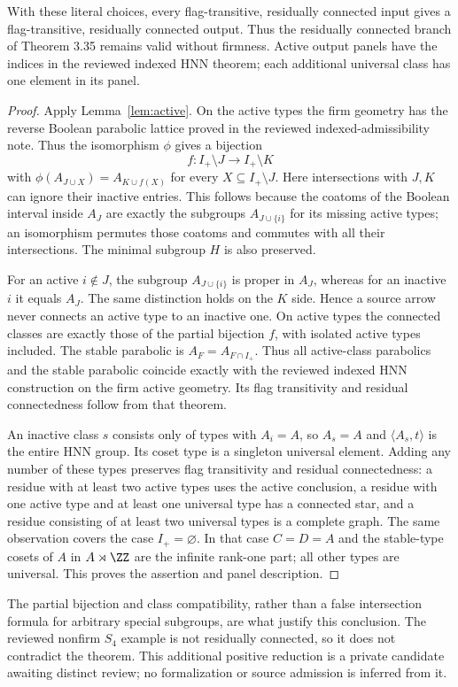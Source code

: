 \begin{theorem}\label{thm:rc}
With these literal choices, every flag-transitive, residually connected
input gives a flag-transitive, residually connected output. Thus the
residually connected branch of Theorem 3.35 remains valid without
firmness. Active output panels have the indices in the reviewed
indexed HNN theorem; each additional universal class has one element
in its panel.
\end{theorem}
\begin{proof}
Apply Lemma~\ref{lem:active}. On the active types the firm geometry
has the reverse Boolean parabolic lattice proved in the reviewed
indexed-admissibility note. Thus the isomorphism $\phi$ gives a
bijection
\[
 f:I_+\setminus J\longrightarrow I_+\setminus K
\]
with
$\phi(A_{J\cup X})=A_{K\cup f(X)}$ for every
$X\subseteq I_+\setminus J$. Here intersections with $J,K$
can ignore their inactive entries. This follows because the coatoms
of the Boolean interval inside $A_J$ are exactly the subgroups
$A_{J\cup\{i\}}$ for its missing active types; an isomorphism
permutes those coatoms and commutes with all their intersections.
The minimal subgroup $H$ is also preserved.

For an active $i\notin J$, the subgroup $A_{J\cup\{i\}}$ is
proper in $A_J$, whereas for an inactive $i$ it equals $A_J$.
The same distinction holds on the $K$ side. Hence a source arrow
never connects an active type to an inactive one. On active types
the connected classes are exactly those of the partial bijection
$f$, with isolated active types included. The stable parabolic is
$A_F=A_{F\cap I_+}$. Thus all active-class parabolics and the
stable parabolic coincide exactly with the reviewed indexed HNN
construction on the firm active geometry. Its flag transitivity and
residual connectedness follow from that theorem.

An inactive class $s$ consists only of types with $A_i=A$, so
$A_s=A$ and $\langle A_s,t\rangle$ is the entire HNN group.
Its coset type is a singleton universal element. Adding any number
of these types preserves flag transitivity and residual connectedness:
a residue with at least two active types uses the active conclusion,
a residue with one active type and at least one universal type has
a connected star, and a residue consisting of at least two universal
types is a complete graph. The same observation covers the case
$I_+=\varnothing$. In that case $C=D=A$ and the stable-type cosets
of $A$ in $A\rtimes\ZZ$ are the infinite rank-one part; all other
types are universal. This proves the assertion and panel description.
\end{proof}
The partial bijection and class compatibility, rather than a false
intersection formula for arbitrary special subgroups, are what justify
this conclusion. The reviewed nonfirm $S_4$ example is not residually
connected, so it does not contradict the theorem. This additional
positive reduction is a private candidate awaiting distinct review;
no formalization or source admission is inferred from it.

